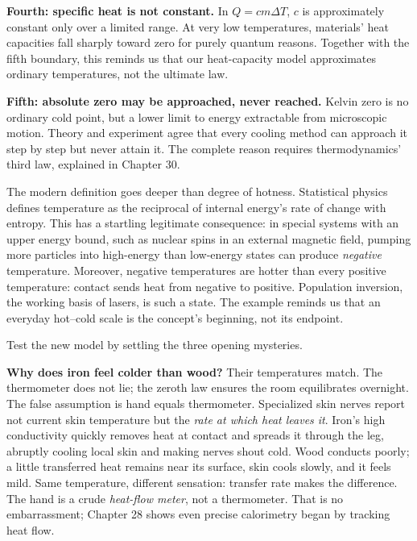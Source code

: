 \textbf{Fourth: specific heat is not constant.} In \(Q=cm\Delta T\), \(c\) is approximately constant only over a limited range. At very low temperatures, materials' heat capacities fall sharply toward zero for purely quantum reasons. Together with the fifth boundary, this reminds us that our heat-capacity model approximates ordinary temperatures, not the ultimate law.

\textbf{Fifth: absolute zero may be approached, never reached.} Kelvin zero is no ordinary cold point, but a lower limit to energy extractable from microscopic motion. Theory and experiment agree that every cooling method can approach it step by step but never attain it. The complete reason requires thermodynamics' third law, explained in Chapter 30.

\begin{challenge}
The modern definition goes deeper than degree of hotness. Statistical physics defines temperature as the reciprocal of internal energy's rate of change with entropy. This has a startling legitimate consequence: in special systems with an upper energy bound, such as nuclear spins in an external magnetic field, pumping more particles into high-energy than low-energy states can produce \emph{negative} temperature. Moreover, negative temperatures are hotter than every positive temperature: contact sends heat from negative to positive. Population inversion, the working basis of lasers, is such a state. The example reminds us that an everyday hot--cold scale is the concept's beginning, not its endpoint.
\end{challenge}


Test the new model by settling the three opening mysteries.

\textbf{Why does iron feel colder than wood?} Their temperatures match. The thermometer does not lie; the zeroth law ensures the room equilibrates overnight. The false assumption is hand equals thermometer. Specialized skin nerves report not current skin temperature but the \emph{rate at which heat leaves it}. Iron's high conductivity quickly removes heat at contact and spreads it through the leg, abruptly cooling local skin and making nerves shout cold. Wood conducts poorly; a little transferred heat remains near its surface, skin cools slowly, and it feels mild. Same temperature, different sensation: transfer rate makes the difference. The hand is a crude \emph{heat-flow meter}, not a thermometer. That is no embarrassment; Chapter 28 shows even precise calorimetry began by tracking heat flow.

